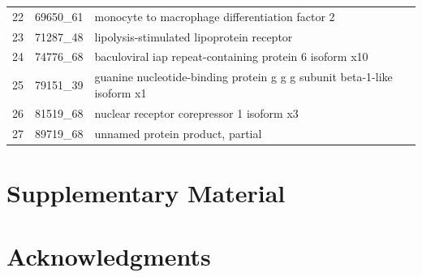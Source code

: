 \documentclass[nogrid]{MBE}%
\begin{document}
\begin{table}[ht]
\begin{tabular}{rll}
  22 & 69650\_61 & monocyte to macrophage differentiation factor 2 \\ 
  23 & 71287\_48 & lipolysis-stimulated lipoprotein receptor \\ 
  24 & 74776\_68 & baculoviral iap repeat-containing protein 6 isoform x10 \\ 
  25 & 79151\_39 & guanine nucleotide-binding protein g g g subunit beta-1-like isoform x1 \\ 
  26 & 81519\_68 & nuclear receptor corepressor 1 isoform x3 \\ 
  27 & 89719\_68 & unnamed protein product, partial \\ 
   \hline
\end{tabular}
\end{table}


\section{Supplementary Material}


\section{Acknowledgments}



\end{document}
